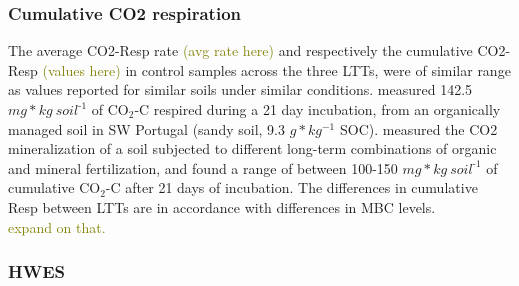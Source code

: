 \documentclass[12pt]{report}
\newcommand{\myGreen}[1]{\textcolor{olive}{#1}} %
\newlength{\SpaceAfterUnit}
\newcommand{\genericunit}{$ mg * kg\ soil^{\text{-}1}$ \hspace*{\SpaceAfterUnit}}
\begin{document}
		\subsubsection{Cumulative CO2  respiration}
			
			The average CO2-Resp rate \myGreen{(avg rate here)} and respectively the cumulative CO2-Resp \myGreen{(values here)} in control samples across the three LTTs, were of similar range as values reported for similar soils under similar conditions. \citet{ribeiro2010} measured 142.5 \genericunit of CO$ _2 $-C respired during a 21 day incubation, from an organically managed soil in SW Portugal (sandy soil, 9.3 $ g * kg^{-1} $ SOC).\citet{rudrappa2006} measured the CO2 mineralization of a soil subjected to different long-term combinations of organic and mineral fertilization, and found a range of between 100-150 \genericunit of cumulative CO$ _2 $-C after 21 days of incubation.
			The differences in cumulative Resp between LTTs are in accordance with differences in MBC levels.\\
			\myGreen{expand on that.}
	
		\subsubsection{HWES}
			
\end{document}
